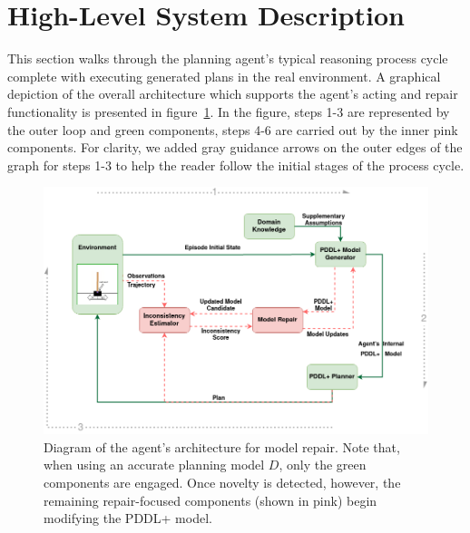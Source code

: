 \documentclass[letterpaper]{article} %
\begin{document}
\section{High-Level System Description}

This section walks through the planning agent's typical reasoning process cycle complete with executing generated plans in the real environment. A graphical depiction of the overall architecture which supports the agent's acting and repair functionality is presented in figure~\ref{fig:repair_architecture}. In the figure, steps 1-3 are represented by the outer loop and green components, steps 4-6 are carried out by the inner pink components. For clarity, we added gray guidance arrows on the outer edges of the graph for steps 1-3 to help the reader follow the initial stages of the process cycle. 

\begin{figure}
	\centering
	\includegraphics[width=\columnwidth]{figures/repair_architecture_guide.png}
	\caption{Diagram of the agent's architecture for model repair. Note that, when using an accurate planning model $D$, only the green components are engaged. Once novelty is detected, however, the remaining repair-focused components (shown in pink) begin modifying the PDDL+ model.}
	\label{fig:repair_architecture}
\end{figure}
\end{document}
